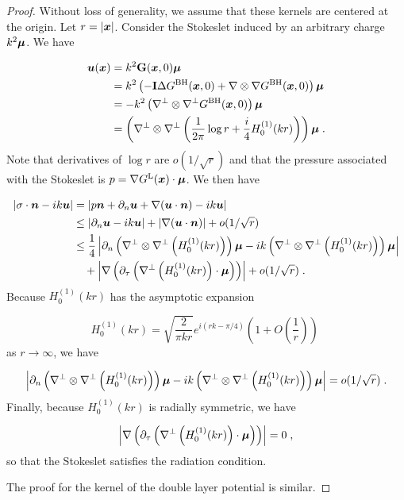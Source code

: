\begin{proof}
Without loss of generality, we assume that these
kernels are centered at the origin. Let $r = |{\boldsymbol x}|$.
Consider the Stokeslet induced by an arbitrary charge
$k^2 {\boldsymbol \mu}$. We have

\begin{align}
{\boldsymbol u} ({\boldsymbol x}) &= k^2 {\bf G}({\boldsymbol x},0) {\boldsymbol \mu} \\
&= k^2 \left (-{\bf I} \Delta G^{\textrm{BH}}({\boldsymbol x},0)
+ \nabla \otimes \nabla G^{\textrm{BH}}({\boldsymbol x},0)\right ) {\boldsymbol \mu} \\
&= -k^2 \left (\nabla^\perp \otimes \nabla^\perp G^{\textrm{BH}}({\boldsymbol x},0) \right) {\boldsymbol \mu} \\
&= \left(\nabla^\perp \otimes \nabla^\perp \left ( \frac{1}{2\pi}
\log r + \frac{i}{4} H_0^{(1)} (kr) \right ) \right){\boldsymbol \mu} \; .
\end{align}
Note that derivatives of $\log r$ are $o(1/\sqrt{r})$
and that the pressure associated with the Stokeslet is
$p = \nabla G^{\textrm{L}}({\boldsymbol x}) \cdot {\boldsymbol \mu}$. We then have

\begin{align}
\left | \sigma \cdot {\boldsymbol n} - i k {\boldsymbol u} \right | &=
\left | p {\boldsymbol n} + \partial_n {\boldsymbol u} + \nabla ({\boldsymbol u} \cdot {\boldsymbol n})
- ik {\boldsymbol u} \right | \\
&\leq \left | \partial_n {\boldsymbol u} - ik{\boldsymbol u} \right | + \left | \nabla({\boldsymbol u} \cdot {\boldsymbol n}) \right |
+ o(1/\sqrt{r}) \\
&\leq \frac{1}{4} \left | \partial_n \left(\nabla^\perp \otimes
\nabla^\perp \left (H_0^{(1)} (kr) \right ) \right){\boldsymbol \mu}
- i k \left(\nabla^\perp \otimes \nabla^\perp
\left (H_0^{(1)} (kr) \right ) \right){\boldsymbol \mu} \right | \\
& \quad + \left | \nabla \left( \partial_\tau \left ( 
\nabla^\perp \left (H_0^{(1)} (kr) \right ) \cdot {\boldsymbol \mu}  \right )
\right) \right | + o(1/\sqrt{r}) \; .
\end{align}
Because $H_0^{(1)}(kr)$ has the asymptotic expansion 

\begin{equation}
H_0^{(1)}(kr) = \sqrt{\frac{2}{\pi k r}} e^{i(rk-\pi/4)} \left ( 1 + O\left (
\frac{1}{r} \right ) \right ) \;
\end{equation}
as $r\to \infty$, we have

\begin{equation}
\left | \partial_n \left(\nabla^\perp \otimes
\nabla^\perp \left (H_0^{(1)} (kr) \right ) \right){\boldsymbol \mu}
- ik \left(\nabla^\perp \otimes \nabla^\perp
\left (H_0^{(1)} (kr) \right ) \right){\boldsymbol \mu} \right | =
o ( 1/\sqrt{r} ) \; .
\end{equation}
Finally, because $H_0^{(1)}(kr)$ is radially symmetric,
we have

\begin{equation}
\left | \nabla \left( \partial_\tau \left ( 
\nabla^\perp \left (H_0^{(1)} (kr) \right ) \cdot {\boldsymbol \mu}  \right )
\right) \right | = 0 \; ,
\end{equation}
so that the Stokeslet satisfies the radiation condition.

The proof for the kernel of the double layer potential
is similar.
\end{proof}




